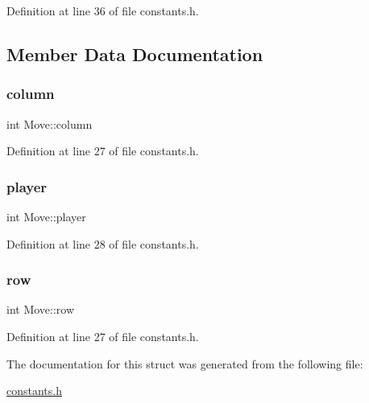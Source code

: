 Definition at line 36 of file constants.\+h.



\subsection{Member Data Documentation}
\mbox{\label{struct_move_a36503ec622ed1932790f7a6885ec37d3}} 
\subsubsection{\texorpdfstring{column}{column}}
{\footnotesize\ttfamily int Move\+::column}



Definition at line 27 of file constants.\+h.

\mbox{\label{struct_move_ad96c39b901881ab1e2e6ab59b994a815}} 
\subsubsection{\texorpdfstring{player}{player}}
{\footnotesize\ttfamily int Move\+::player}



Definition at line 28 of file constants.\+h.

\mbox{\label{struct_move_a078eb7da4c5a1bd0b9810453b1c25036}} 
\subsubsection{\texorpdfstring{row}{row}}
{\footnotesize\ttfamily int Move\+::row}



Definition at line 27 of file constants.\+h.



The documentation for this struct was generated from the following file\+:\begin{DoxyCompactItemize}
\item 
\hyperlink{constants_8h}{constants.\+h}\end{DoxyCompactItemize}
